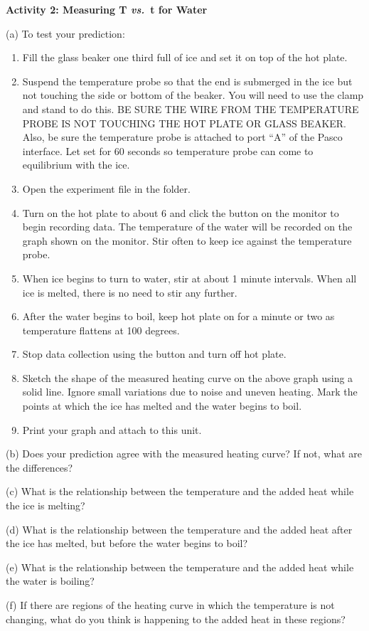 \newpage

\textbf{Activity 2: Measuring T \textit{vs.}~t for Water} 

(a) To test your prediction: 

\begin{enumerate}
\item Fill the glass beaker one third full of ice and set it on top of the hot plate.
\item Suspend the temperature probe so that the end is submerged in the ice but not touching the side or bottom of the beaker. You will need to use the clamp and stand to do this. BE SURE THE WIRE FROM THE TEMPERATURE PROBE IS NOT TOUCHING THE HOT PLATE OR GLASS BEAKER. Also, be sure the temperature probe is attached to port ``A'' of the Pasco interface. Let set for 60 seconds so temperature probe can come to equilibrium with the ice.
\item Open the  experiment file in the
\filename{\coursefolder} folder.
\item Turn on the hot plate to about 6 and click the
 button on the monitor to begin recording data. The temperature of the water will be recorded on the graph shown on the monitor. Stir often to keep ice against the temperature probe.
\item When ice begins to turn to water, stir at about 1 minute intervals. When all ice is melted, there is no need to stir any further.
\item After the water begins to boil, keep hot plate on for a minute or two as temperature flattens at 100 degrees.
\item Stop data collection using the  button and turn off hot plate.
\item Sketch the shape of the measured heating curve on the above graph
using a solid line. Ignore small variations due to noise and uneven
heating. Mark the points at which the ice has melted and the water
begins to boil.
\item Print your graph and attach to this unit.
\end{enumerate}
(b) Does your prediction agree with the measured heating curve? If
not, what are the differences?
\vspace{15mm}

(c) What is the relationship between the temperature and the added
heat while the ice is melting?
\vspace{15mm}

(d) What is the relationship between the temperature and the added
heat after the ice has melted, but before the water begins to boil?
\vspace{15mm}

(e) What is the relationship between the temperature and the added
heat while the water is boiling?
\vspace{15mm}

(f) If there are regions of the heating curve in which the temperature
is not changing, what do you think is happening to the added heat
in these regions?\vspace{20mm}


